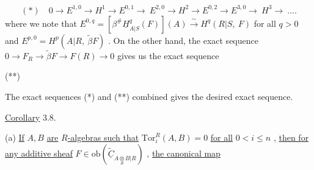 \begin{equation*}
(*)\quad 0 \to E^{1,0} \to H^{1} \to E^{0,1}\!\to\ E^{2,0} \to H^{2} \to E^{0,2} \to E^{3,0}\!\to\ H^{3} \to\ ....
\end{equation*}
where we note that  $E^{0,q} = [\beta^{\#}\underline{H}^{q}_{A|S}(F)](A) \overset{\sim}{\to} H^{q}(R|S,\ F)$  for all  $q > 0$  and $E^{p,0} = H^{p}(A|R,\ \widetilde{\beta}F)$ . On the other hand, the exact sequence  $0 \to F_{R} \to \widetilde{\beta}F \to F(R) \to 0$ gives us the exact sequence

{\footnotesize (**)\quad{}}
The exact sequences (*) and (**) combined gives the desired exact sequence.



\underline{Corollary} 3.8.

(a)  \underline{If}  $A, B$  \underline{are} $R$\underline{-algebras such that}  $\mathrm{Tor}^{R}_{i}(A, B) = 0$  \underline{for all} $0 < i \leq n$  , \underline{then for any additive sheaf}  $F \in \mathrm{ob}(\widetilde{\underline{C}}_{A\underset{R}{\otimes}B|R})$  , \underline{the canonical map}

